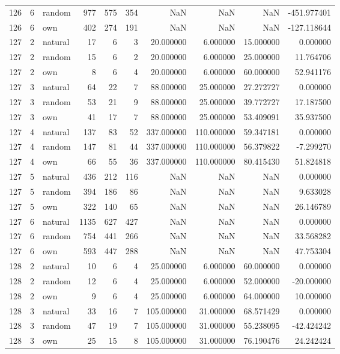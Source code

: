\begin{table}[htbp]
\begin{tabular}{rrlrrrrrrr}
126 & 6 & random & 977 & 575 & 354 & NaN & NaN & NaN & -451.977401 \\
126 & 6 & own & 402 & 274 & 191 & NaN & NaN & NaN & -127.118644 \\
127 & 2 & natural & 17 & 6 & 3 & 20.000000 & 6.000000 & 15.000000 & 0.000000 \\
127 & 2 & random & 15 & 6 & 2 & 20.000000 & 6.000000 & 25.000000 & 11.764706 \\
127 & 2 & own & 8 & 6 & 4 & 20.000000 & 6.000000 & 60.000000 & 52.941176 \\
127 & 3 & natural & 64 & 22 & 7 & 88.000000 & 25.000000 & 27.272727 & 0.000000 \\
127 & 3 & random & 53 & 21 & 9 & 88.000000 & 25.000000 & 39.772727 & 17.187500 \\
127 & 3 & own & 41 & 17 & 7 & 88.000000 & 25.000000 & 53.409091 & 35.937500 \\
127 & 4 & natural & 137 & 83 & 52 & 337.000000 & 110.000000 & 59.347181 & 0.000000 \\
127 & 4 & random & 147 & 81 & 44 & 337.000000 & 110.000000 & 56.379822 & -7.299270 \\
127 & 4 & own & 66 & 55 & 36 & 337.000000 & 110.000000 & 80.415430 & 51.824818 \\
127 & 5 & natural & 436 & 212 & 116 & NaN & NaN & NaN & 0.000000 \\
127 & 5 & random & 394 & 186 & 86 & NaN & NaN & NaN & 9.633028 \\
127 & 5 & own & 322 & 140 & 65 & NaN & NaN & NaN & 26.146789 \\
127 & 6 & natural & 1135 & 627 & 427 & NaN & NaN & NaN & 0.000000 \\
127 & 6 & random & 754 & 441 & 266 & NaN & NaN & NaN & 33.568282 \\
127 & 6 & own & 593 & 447 & 288 & NaN & NaN & NaN & 47.753304 \\
128 & 2 & natural & 10 & 6 & 4 & 25.000000 & 6.000000 & 60.000000 & 0.000000 \\
128 & 2 & random & 12 & 6 & 4 & 25.000000 & 6.000000 & 52.000000 & -20.000000 \\
128 & 2 & own & 9 & 6 & 4 & 25.000000 & 6.000000 & 64.000000 & 10.000000 \\
128 & 3 & natural & 33 & 16 & 7 & 105.000000 & 31.000000 & 68.571429 & 0.000000 \\
128 & 3 & random & 47 & 19 & 7 & 105.000000 & 31.000000 & 55.238095 & -42.424242 \\
128 & 3 & own & 25 & 15 & 8 & 105.000000 & 31.000000 & 76.190476 & 24.242424 \\

\end{tabular}
\end{table}
